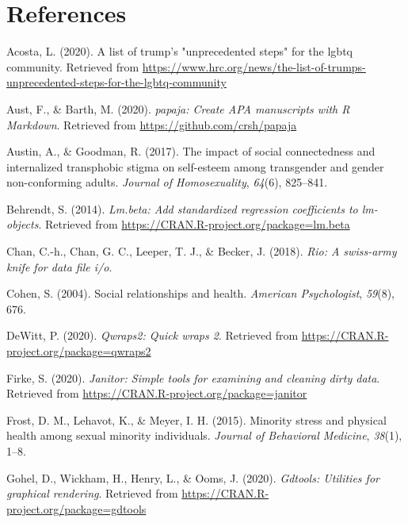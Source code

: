 \documentclass[
  english,
  man,floatsintext]{apa6}
\begin{document}
\hypertarget{references}{%
\section{References}\label{references}}

\begingroup
\setlength{\parindent}{-0.5in}
\setlength{\leftskip}{0.5in}

\hypertarget{refs}{}
\leavevmode\hypertarget{ref-Acosta2020}{}%
Acosta, L. (2020). A list of trump's "unprecedented steps" for the lgbtq community. Retrieved from \url{https://www.hrc.org/news/the-list-of-trumps-unprecedented-steps-for-the-lgbtq-community}

\leavevmode\hypertarget{ref-R-papaja}{}%
Aust, F., \& Barth, M. (2020). \emph{papaja: Create APA manuscripts with R Markdown}. Retrieved from \url{https://github.com/crsh/papaja}

\leavevmode\hypertarget{ref-austin2017}{}%
Austin, A., \& Goodman, R. (2017). The impact of social connectedness and internalized transphobic stigma on self-esteem among transgender and gender non-conforming adults. \emph{Journal of Homosexuality}, \emph{64}(6), 825--841.

\leavevmode\hypertarget{ref-R-lm.beta}{}%
Behrendt, S. (2014). \emph{Lm.beta: Add standardized regression coefficients to lm-objects}. Retrieved from \url{https://CRAN.R-project.org/package=lm.beta}

\leavevmode\hypertarget{ref-R-rio}{}%
Chan, C.-h., Chan, G. C., Leeper, T. J., \& Becker, J. (2018). \emph{Rio: A swiss-army knife for data file i/o}.

\leavevmode\hypertarget{ref-cohen2004}{}%
Cohen, S. (2004). Social relationships and health. \emph{American Psychologist}, \emph{59}(8), 676.

\leavevmode\hypertarget{ref-R-qwraps2}{}%
DeWitt, P. (2020). \emph{Qwraps2: Quick wraps 2}. Retrieved from \url{https://CRAN.R-project.org/package=qwraps2}

\leavevmode\hypertarget{ref-R-janitor}{}%
Firke, S. (2020). \emph{Janitor: Simple tools for examining and cleaning dirty data}. Retrieved from \url{https://CRAN.R-project.org/package=janitor}

\leavevmode\hypertarget{ref-frost2015}{}%
Frost, D. M., Lehavot, K., \& Meyer, I. H. (2015). Minority stress and physical health among sexual minority individuals. \emph{Journal of Behavioral Medicine}, \emph{38}(1), 1--8.

\leavevmode\hypertarget{ref-R-gdtools}{}%
Gohel, D., Wickham, H., Henry, L., \& Ooms, J. (2020). \emph{Gdtools: Utilities for graphical rendering}. Retrieved from \url{https://CRAN.R-project.org/package=gdtools}
\end{document}
